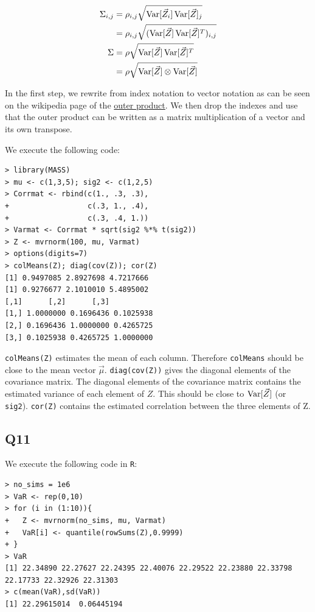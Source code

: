 \begin{align}
\Sigma_{i,j} & = \rho_{i,j} \sqrt{\operatorname{\text{Var}}[\vec{Z}_i]\operatorname{\text{Var}}[\vec{Z}]_j} \\
             & = \rho_{i,j} \sqrt{(\operatorname{\text{Var}}[\vec{Z}]\operatorname{\text{Var}}[\vec{Z}]^{T})_{i,j}} \\
\Sigma       & = \rho \sqrt{\operatorname{\text{Var}}[\vec{Z}]\operatorname{\text{Var}}[\vec{Z}]^{T}} \\
             & = \rho \sqrt{\operatorname{\text{Var}}[\vec{Z}] \otimes \operatorname{\text{Var}}[\vec{Z}]}
\end{align}

In the first step, we rewrite from index notation to vector notation as can be seen on the wikipedia page of the \href{https://en.wikipedia.org/wiki/Outer_product}{outer product}. We then drop the indexes and use that the outer product can be written as a matrix multiplication of a vector and its own transpose.

We execute the following code:

\begin{verbatim}
> library(MASS)
> mu <- c(1,3,5); sig2 <- c(1,2,5)
> Corrmat <- rbind(c(1., .3, .3),
+                  c(.3, 1., .4),
+                  c(.3, .4, 1.))
> Varmat <- Corrmat * sqrt(sig2 %*% t(sig2))
> Z <- mvrnorm(100, mu, Varmat)
> options(digits=7)
> colMeans(Z); diag(cov(Z)); cor(Z)
[1] 0.9497085 2.8927698 4.7217666
[1] 0.9276677 2.1010010 5.4895002
[,1]      [,2]      [,3]
[1,] 1.0000000 0.1696436 0.1025938
[2,] 0.1696436 1.0000000 0.4265725
[3,] 0.1025938 0.4265725 1.0000000
\end{verbatim}

\verb|colMeans(Z)| estimates the mean of each column. Therefore \verb|colMeans| should be close to the mean vector $\vec{\mu}$.
\verb|diag(cov(Z))| gives the diagonal elements of the covariance matrix. The diagonal elements of the covariance matrix contains the estimated variance of each element of $Z$. This should be close to $\operatorname{\text{Var}}[\vec{Z}]$ (or \verb|sig2|).
\verb|cor(Z)| contains the estimated correlation between the three elements of Z.

\subsection*{Q11}

We execute the following code in \verb|R|:

\begin{verbatim}
> no_sims = 1e6
> VaR <- rep(0,10)
> for (i in (1:10)){
+   Z <- mvrnorm(no_sims, mu, Varmat)
+   VaR[i] <- quantile(rowSums(Z),0.9999)
+ }
> VaR
[1] 22.34890 22.27627 22.24395 22.40076 22.29522 22.23880 22.33798 22.17733 22.32926 22.31303
> c(mean(VaR),sd(VaR))
[1] 22.29615014  0.06445194
\end{verbatim}

